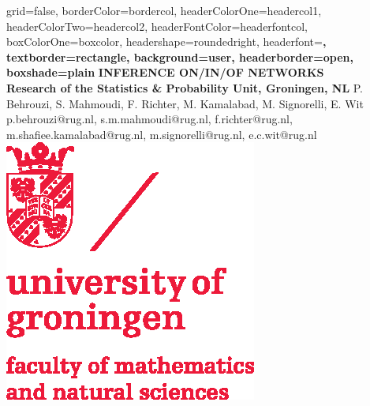 \documentclass[a0paper,portrait]{baposter}
\begin{document}
\begin{poster}{
grid=false,
borderColor=bordercol, %
headerColorOne=headercol1, %
headerColorTwo=headercol2, %
headerFontColor=headerfontcol, %
boxColorOne=boxcolor, %
headershape=roundedright, %
headerfont=\Large\sf\bf, %
textborder=rectangle,
background=user,
headerborder=open, %
boxshade=plain
}
{}
%
%
{\sf\bf  INFERENCE ON/IN/OF NETWORKS \\ {\small Research of the Statistics \& Probability Unit, Groningen, NL}} %
{\vspace{1em} P. Behrouzi, S. Mahmoudi, F. Richter, M. Kamalabad, M. Signorelli, E. Wit \\ %
{\footnotesize p.behrouzi@rug.nl, s.m.mahmoudi@rug.nl, f.richter@rug.nl, m.shafiee.kamalabad@rug.nl, m.signorelli@rug.nl, e.c.wit@rug.nl}} %
{\includegraphics[scale=0.7]{logo.eps}} %



\end{poster}
\end{document}
